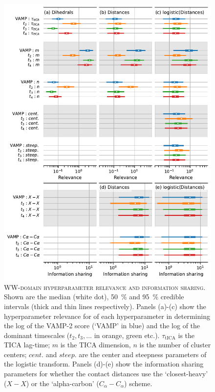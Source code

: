\documentclass{article}
\begin{document}
\begin{figure}
    \centering
    \includegraphics[height=0.8\textheight]{figures/sensitivities/gtt_sensitivity.pdf}
    \caption{\textsc{WW-domain hyperparameter relevance and information sharing}. Shown are the  median (white dot), \SI{50}{\percent} and \SI{95}{\percent} credible intervals (thick and thin lines respectively).  Panels (a)-(c) show the hyperparameter relevance for of each hyperparameter in determining the log of the VAMP-2 score (`VAMP' in blue) and the log of the dominant timescales ($t_{2}, t_{3}, ...$ in orange, green etc.). $\tau_{\mathrm{tICA}}$ is the TICA lag-time; $m$ is the TICA dimension, $n$ is the number of cluster centers; $cent.$ and $steep.$ are the center and steepness parameters of the logistic transform. Panels (d)-(e) show the information sharing parameters for whether the contact distances use the `closest-heavy' ($X-X$) or the `alpha-carbon' ($C_{\alpha}-C_{\alpha}$) scheme.  }
    \label{fig:gtt_sense}
\end{figure}
\end{document}
